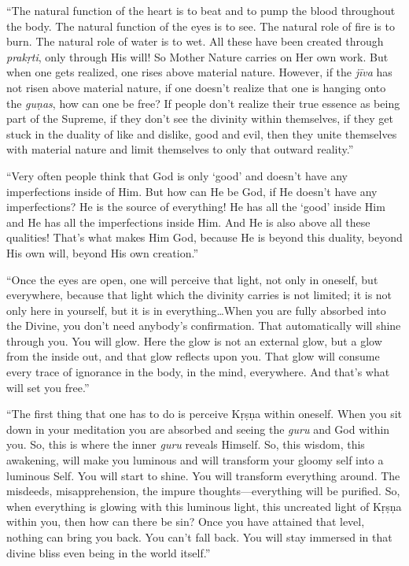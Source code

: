\enquote{The natural function of the heart is to beat and to pump the blood throughout the body. The natural function of the eyes is to see. The natural role of fire is to burn. The natural role of water is to wet. All these have been created through \textit{prakṛti}, only through His will! So Mother Nature carries on Her own work. But when one gets realized, one rises above material nature. However, if the \textit{jīva} has not risen above material nature, if one doesn’t realize that one is hanging onto the \textit{guṇas}, how can one be free? If people don’t realize their true essence as being part of the Supreme, if they don’t see the divinity within themselves, if they get stuck in the duality of like and dislike, good and evil, then they unite themselves with material nature and limit themselves to only that outward reality.}

\enquote{Very often people think that God is only \enquote{good} and doesn’t have any imperfections inside of Him. But how can He be God, if He doesn’t have any imperfections? He is the source of everything! He has all the \enquote{good} inside Him and He has all the imperfections inside Him. And He is also above all these qualities! That’s what makes Him God, because He is beyond this duality, beyond His own will, beyond His own creation.}

\enquote{Once the eyes are open, one will perceive that light, not only in oneself, but everywhere, because that light which the divinity carries is not limited; it is not only here in yourself, but it is in everything\ldots When you are fully absorbed into the Divine, you don’t need anybody’s confirmation. That automatically will shine through you. You will glow. Here the glow is not an external glow, but a glow from the inside out, and that glow reflects upon you. That glow will consume every trace of ignorance in the body, in the mind, everywhere. And that’s what will set you free.}

\enquote{The first thing that one has to do is perceive Kṛṣṇa within oneself. When you sit down in your meditation you are absorbed and seeing the \textit{guru} and God within you. So, this is where the inner \textit{guru} reveals Himself. So, this wisdom, this awakening, will make you luminous and will transform your gloomy self into a luminous Self. You will start to shine. You will transform everything around. The misdeeds, misapprehension, the impure thoughts---everything will be purified. So, when everything is glowing with this luminous light, this uncreated light of Kṛṣṇa within you, then how can there be sin? Once you have attained that level, nothing can bring you back. You can’t fall back. You will stay immersed in that divine bliss even being in the world itself.}

